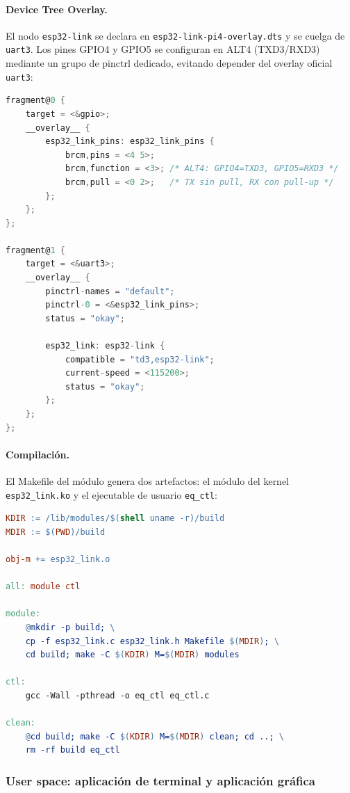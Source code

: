 \documentclass[RT]{UTNLSE}
\begin{document}
\paragraph{Device Tree Overlay.} El nodo \texttt{esp32-link} se declara en \texttt{esp32-link-pi4-overlay.dts} y se cuelga de \texttt{uart3}. Los pines GPIO4 y GPIO5 se configuran en ALT4 (TXD3/RXD3) mediante un grupo de pinctrl dedicado, evitando depender del overlay oficial \texttt{uart3}:

\begin{lstlisting}[language=C, caption={Extracto del Device Tree Overlay}]
fragment@0 {
    target = <&gpio>;
    __overlay__ {
        esp32_link_pins: esp32_link_pins {
            brcm,pins = <4 5>;
            brcm,function = <3>; /* ALT4: GPIO4=TXD3, GPIO5=RXD3 */
            brcm,pull = <0 2>;   /* TX sin pull, RX con pull-up */
        };
    };
};

fragment@1 {
    target = <&uart3>;
    __overlay__ {
        pinctrl-names = "default";
        pinctrl-0 = <&esp32_link_pins>;
        status = "okay";

        esp32_link: esp32-link {
            compatible = "td3,esp32-link";
            current-speed = <115200>;
            status = "okay";
        };
    };
};
\end{lstlisting}

\paragraph{Compilación.} El Makefile del módulo genera dos artefactos: el módulo del kernel \texttt{esp32\_link.ko} y el ejecutable de usuario \texttt{eq\_ctl}:

\begin{lstlisting}[language=make, caption={Makefile del módulo y del cliente de usuario}]
KDIR := /lib/modules/$(shell uname -r)/build
MDIR := $(PWD)/build

obj-m += esp32_link.o

all: module ctl

module:
    @mkdir -p build; \
    cp -f esp32_link.c esp32_link.h Makefile $(MDIR); \
    cd build; make -C $(KDIR) M=$(MDIR) modules

ctl:
    gcc -Wall -pthread -o eq_ctl eq_ctl.c

clean:
    @cd build; make -C $(KDIR) M=$(MDIR) clean; cd ..; \
    rm -rf build eq_ctl
\end{lstlisting}

\subsubsection{User space: aplicación de terminal y aplicación gráfica}
\end{document}
